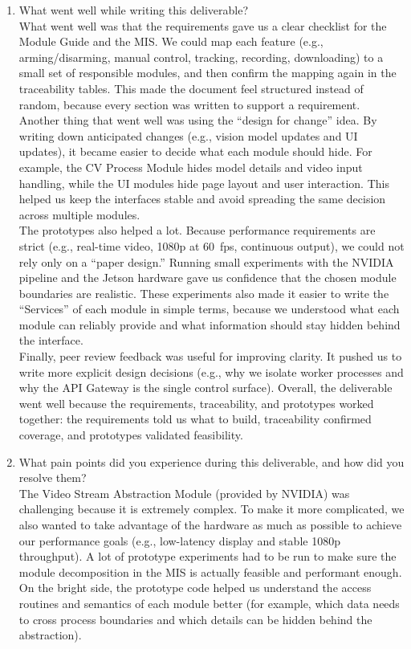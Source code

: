 \documentclass[12pt, titlepage]{article}
\begin{document}
\begin{enumerate}
  \item What went well while writing this deliverable? \\[2mm]
        What went well was that the requirements gave us a clear checklist for the Module Guide and the MIS. We could map each feature (e.g., arming/disarming, manual control, tracking, recording, downloading) to a small set of responsible modules, and then confirm the mapping again in the traceability tables. This made the document feel structured instead of random, because every section was written to support a requirement. \\[2mm]
        Another thing that went well was using the ``design for change'' idea. By writing down anticipated changes (e.g., vision model updates and UI updates), it became easier to decide what each module should hide. For example, the CV Process Module hides model details and video input handling, while the UI modules hide page layout and user interaction. This helped us keep the interfaces stable and avoid spreading the same decision across multiple modules. \\[2mm]
        The prototypes also helped a lot. Because performance requirements are strict (e.g., real-time video, 1080p at 60~fps, continuous output), we could not rely only on a ``paper design.'' Running small experiments with the NVIDIA pipeline and the Jetson hardware gave us confidence that the chosen module boundaries are realistic. These experiments also made it easier to write the ``Services'' of each module in simple terms, because we understood what each module can reliably provide and what information should stay hidden behind the interface. \\[2mm]
        Finally, peer review feedback was useful for improving clarity. It pushed us to write more explicit design decisions (e.g., why we isolate worker processes and why the API Gateway is the single control surface). Overall, the deliverable went well because the requirements, traceability, and prototypes worked together: the requirements told us what to build, traceability confirmed coverage, and prototypes validated feasibility.

  \item What pain points did you experience during this deliverable, and how did you
        resolve them? \\[2mm]
        The Video Stream Abstraction Module (provided by NVIDIA) was challenging because it is extremely complex. To make it more complicated, we also wanted to take advantage of the hardware as much as possible to achieve our performance goals (e.g., low-latency display and stable 1080p throughput). A lot of prototype experiments had to be run to make sure the module decomposition in the MIS is actually feasible and performant enough. On the bright side, the prototype code helped us understand the access routines and semantics of each module better (for example, which data needs to cross process boundaries and which details can be hidden behind the abstraction).


\end{enumerate}
\end{document}
